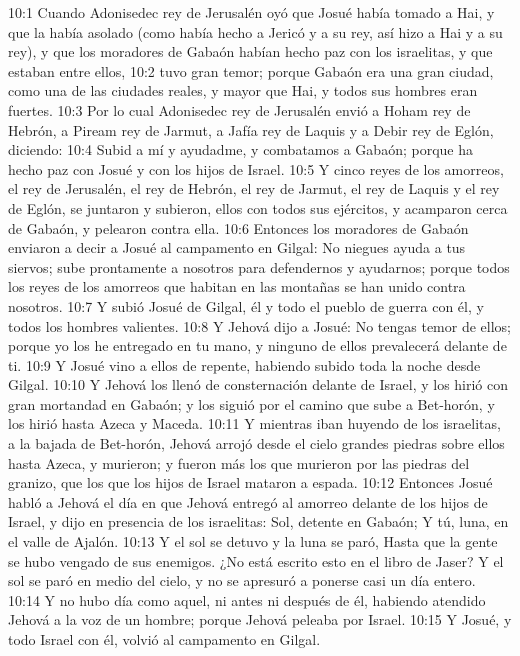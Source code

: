 10:1 Cuando Adonisedec rey de Jerusalén oyó que Josué había tomado a Hai, y que la había asolado (como había hecho a Jericó y a su rey, así hizo a Hai y a su rey), y que los moradores de Gabaón habían hecho paz con los israelitas, y que estaban entre ellos,  
10:2 tuvo gran temor; porque Gabaón era una gran ciudad, como una de las ciudades reales, y mayor que Hai, y todos sus hombres eran fuertes.  
10:3 Por lo cual Adonisedec rey de Jerusalén envió a Hoham rey de Hebrón, a Piream rey de Jarmut, a Jafía rey de Laquis y a Debir rey de Eglón, diciendo:  
10:4 Subid a mí y ayudadme, y combatamos a Gabaón; porque ha hecho paz con Josué y con los hijos de Israel.  
10:5 Y cinco reyes de los amorreos, el rey de Jerusalén, el rey de Hebrón, el rey de Jarmut, el rey de Laquis y el rey de Eglón, se juntaron y subieron, ellos con todos sus ejércitos, y acamparon cerca de Gabaón, y pelearon contra ella.  
10:6 Entonces los moradores de Gabaón enviaron a decir a Josué al campamento en Gilgal: No niegues ayuda a tus siervos; sube prontamente a nosotros para defendernos y ayudarnos; porque todos los reyes de los amorreos que habitan en las montañas se han unido contra nosotros.  
10:7 Y subió Josué de Gilgal, él y todo el pueblo de guerra con él, y todos los hombres valientes.  
10:8 Y Jehová dijo a Josué: No tengas temor de ellos; porque yo los he entregado en tu mano, y ninguno de ellos prevalecerá delante de ti.  
10:9 Y Josué vino a ellos de repente, habiendo subido toda la noche desde Gilgal.  
10:10 Y Jehová los llenó de consternación delante de Israel, y los hirió con gran mortandad en Gabaón; y los siguió por el camino que sube a Bet-horón, y los hirió hasta Azeca y Maceda.  
10:11 Y mientras iban huyendo de los israelitas, a la bajada de Bet-horón, Jehová arrojó desde el cielo grandes piedras sobre ellos hasta Azeca, y murieron; y fueron más los que murieron por las piedras del granizo, que los que los hijos de Israel mataron a espada.  
10:12 Entonces Josué habló a Jehová el día en que Jehová entregó al amorreo delante de los hijos de Israel, y dijo en presencia de los israelitas:  
Sol, detente en Gabaón;  
Y tú, luna, en el valle de Ajalón. 
10:13 Y el sol se detuvo y la luna se paró,  
Hasta que la gente se hubo vengado de sus enemigos.  
¿No está escrito esto en el libro de Jaser? Y el sol se paró en medio del cielo, y no se apresuró a ponerse casi un día entero.  
10:14 Y no hubo día como aquel, ni antes ni después de él, habiendo atendido Jehová a la voz de un hombre; porque Jehová peleaba por Israel.  
10:15 Y Josué, y todo Israel con él, volvió al campamento en Gilgal.  
